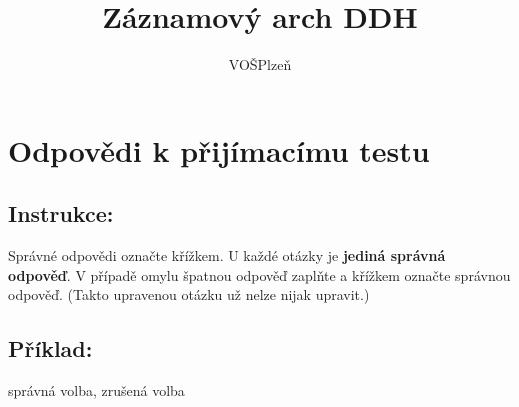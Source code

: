 \documentclass[
	13pt,
	a4paper,
	oneside]{sdapsclassic} %
\author{VOŠPlzeň}
\title{Záznamový arch DDH}
\begin{document}
	
	\begin{multicols}{6}
	\end{multicols}
		
	

    \section{Odpovědi k přijímacímu testu}
    \subsection{Instrukce:}
    Správné odpovědi označte křížkem. U každé otázky je \textbf{jediná správná odpověď}. V případě omylu špatnou odpověď zaplňte a křížkem označte správnou odpověď. (Takto upravenou otázku už nelze nijak upravit.)
    \subsection{Příklad:}
    \checkedbox*{} správná volba,  \correctedbox*{} zrušená volba
    
    \medskip %

\end{document}
